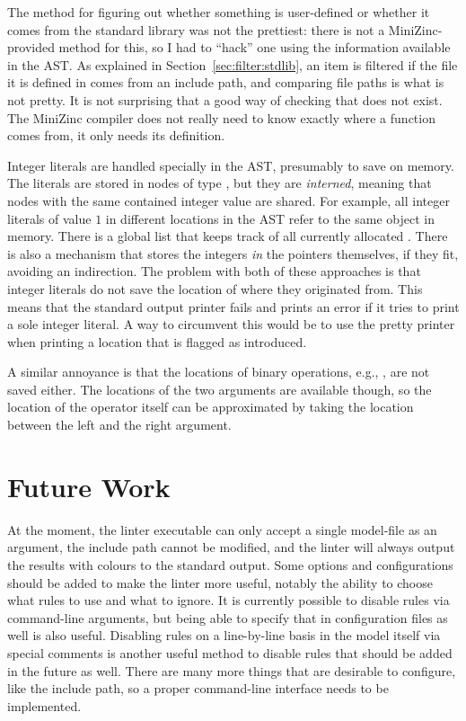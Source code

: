 \documentclass[a4paper,12pt]{article}
\begin{document}
The method for figuring out whether something is user-defined or whether it comes from the
standard library was not the prettiest: there is not a MiniZinc-provided method for this,
so I had to ``hack'' one using the information available in the AST.
As explained in Section~\ref{sec:filter:stdlib},
an item is filtered if the file it is defined in comes from an include path, and comparing
file paths is what is not pretty. It is not
surprising that a good way of checking that does not exist. The MiniZinc compiler does not
really need to know exactly where a function comes from, it only needs its definition.

Integer literals are handled specially in the AST, presumably to save on memory. The
literals are stored in nodes of type , but they are \emph{interned}, meaning that
nodes with the same contained integer value are shared. For example, all integer literals
of value $1$ in different locations in the AST refer to the same object in memory. There
is a global list that keeps track of all currently allocated . There is
also a mechanism that stores the integers \emph{in} the pointers themselves, if they fit,
avoiding an indirection. The problem with both of these approaches is that integer
literals do not save the location of where they originated from. This means that the
standard output printer fails and prints an error if it tries to print a sole integer
literal. A way to circumvent this would be to use the pretty printer when printing a
location that is flagged as introduced.

A similar annoyance is that the locations of binary operations, e.g., \mi{/\\}, are not
saved either. The locations of the two arguments are available though, so the location of the
operator itself can be approximated by taking the location between the left and the right
argument.

\section{Future Work}\label{sec:future}
At the moment, the linter executable can only accept a single model-file as an argument,
the include path cannot be modified, and the linter will always output the results with
colours to the standard output.
Some options and configurations should be added to make the linter more useful, notably
the ability to choose what rules to use and what to ignore. It is currently possible to disable
rules via command-line arguments, but being able to specify that in configuration files as well is also useful.
Disabling rules on a line-by-line basis in the model itself via special comments is another useful
method to disable rules that should be added in the future as well.
There are many more things that are desirable to configure, like the include path, so a proper command-line
interface needs to be implemented.
\end{document}
